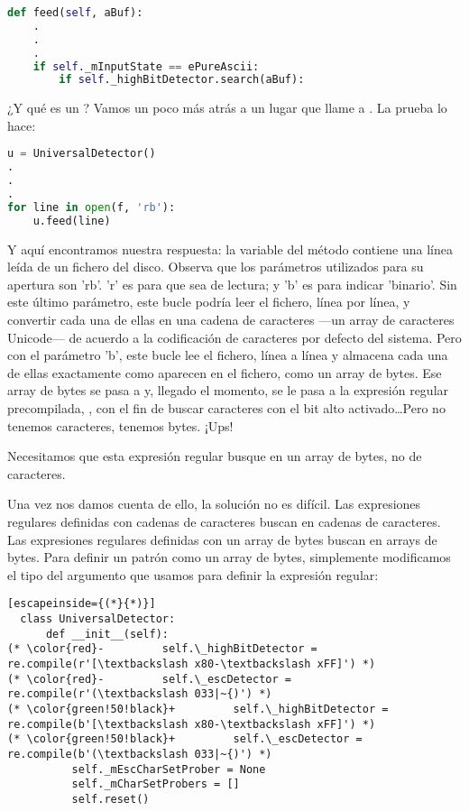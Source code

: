 \begin{lstlisting}[language=Python,breaklines=true]
def feed(self, aBuf):
    .
    .
    .
    if self._mInputState == ePureAscii:
        if self._highBitDetector.search(aBuf):
\end{lstlisting}

¿Y qué es un ? Vamos un poco más atrás a un lugar que llame a . La prueba  lo hace:


\begin{lstlisting}[language=Python,breaklines=true]
u = UniversalDetector()
.
.
.
for line in open(f, 'rb'):
    u.feed(line)
\end{lstlisting}

Y aquí encontramos nuestra respuesta: la variable  del método  contiene una línea leída de un fichero del disco. Observa que los parámetros utilizados para su apertura son 'rb'. 'r' es para que sea de lectura; y 'b' es para indicar 'binario'. Sin este último parámetro, este bucle  podría leer el fichero, línea por línea, y convertir cada una de ellas en una cadena de caracteres ---un array de caracteres Unicode--- de acuerdo a la codificación de caracteres por defecto del sistema. Pero con el parámetro 'b', este bucle  lee el fichero, línea a línea y almacena cada una de ellas exactamente como aparecen en el fichero, como un array de bytes. Ese array de bytes se pasa a  y, llegado el momento, se le pasa a la expresión regular precompilada, , con el fin de buscar caracteres con el bit alto activado\ldots Pero no tenemos caracteres, tenemos bytes. ¡Ups!

Necesitamos que esta expresión regular busque en un array de bytes, no de caracteres.

Una vez nos damos cuenta de ello, la solución no es difícil. Las expresiones regulares definidas con cadenas de caracteres buscan en cadenas de caracteres. Las expresiones regulares definidas con un array de bytes buscan en arrays de bytes. Para definir un patrón como un array de bytes, simplemente modificamos el tipo del argumento que usamos para definir la expresión regular:

\begin{lstlisting}[escapeinside={(*}{*)}]
  class UniversalDetector:
      def __init__(self):
(* \color{red}-         self.\_highBitDetector = re.compile(r'[\textbackslash x80-\textbackslash xFF]') *)
(* \color{red}-         self.\_escDetector = re.compile(r'(\textbackslash 033|~{)') *)
(* \color{green!50!black}+         self.\_highBitDetector = re.compile(b'[\textbackslash x80-\textbackslash xFF]') *)
(* \color{green!50!black}+         self.\_escDetector = re.compile(b'(\textbackslash 033|~{)') *)
          self._mEscCharSetProber = None
          self._mCharSetProbers = []
          self.reset()
\end{lstlisting}

